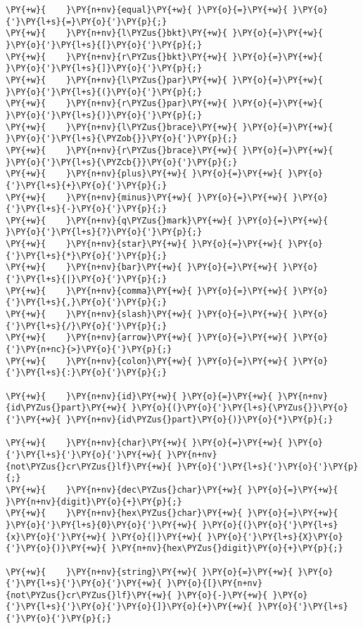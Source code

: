 \begin{Verbatim}[commandchars=\\\{\}]
\PY{+w}{    }\PY{n+nv}{equal}\PY{+w}{ }\PY{o}{=}\PY{+w}{ }\PY{o}{'}\PY{l+s}{=}\PY{o}{'}\PY{p}{;}
\PY{+w}{    }\PY{n+nv}{l\PYZus{}bkt}\PY{+w}{ }\PY{o}{=}\PY{+w}{ }\PY{o}{'}\PY{l+s}{[}\PY{o}{'}\PY{p}{;}
\PY{+w}{    }\PY{n+nv}{r\PYZus{}bkt}\PY{+w}{ }\PY{o}{=}\PY{+w}{ }\PY{o}{'}\PY{l+s}{]}\PY{o}{'}\PY{p}{;}
\PY{+w}{    }\PY{n+nv}{l\PYZus{}par}\PY{+w}{ }\PY{o}{=}\PY{+w}{ }\PY{o}{'}\PY{l+s}{(}\PY{o}{'}\PY{p}{;}
\PY{+w}{    }\PY{n+nv}{r\PYZus{}par}\PY{+w}{ }\PY{o}{=}\PY{+w}{ }\PY{o}{'}\PY{l+s}{)}\PY{o}{'}\PY{p}{;}
\PY{+w}{    }\PY{n+nv}{l\PYZus{}brace}\PY{+w}{ }\PY{o}{=}\PY{+w}{  }\PY{o}{'}\PY{l+s}{\PYZob{}}\PY{o}{'}\PY{p}{;}
\PY{+w}{    }\PY{n+nv}{r\PYZus{}brace}\PY{+w}{ }\PY{o}{=}\PY{+w}{  }\PY{o}{'}\PY{l+s}{\PYZcb{}}\PY{o}{'}\PY{p}{;}
\PY{+w}{    }\PY{n+nv}{plus}\PY{+w}{ }\PY{o}{=}\PY{+w}{ }\PY{o}{'}\PY{l+s}{+}\PY{o}{'}\PY{p}{;}
\PY{+w}{    }\PY{n+nv}{minus}\PY{+w}{ }\PY{o}{=}\PY{+w}{ }\PY{o}{'}\PY{l+s}{-}\PY{o}{'}\PY{p}{;}
\PY{+w}{    }\PY{n+nv}{q\PYZus{}mark}\PY{+w}{ }\PY{o}{=}\PY{+w}{ }\PY{o}{'}\PY{l+s}{?}\PY{o}{'}\PY{p}{;}
\PY{+w}{    }\PY{n+nv}{star}\PY{+w}{ }\PY{o}{=}\PY{+w}{ }\PY{o}{'}\PY{l+s}{*}\PY{o}{'}\PY{p}{;}
\PY{+w}{    }\PY{n+nv}{bar}\PY{+w}{ }\PY{o}{=}\PY{+w}{ }\PY{o}{'}\PY{l+s}{|}\PY{o}{'}\PY{p}{;}
\PY{+w}{    }\PY{n+nv}{comma}\PY{+w}{ }\PY{o}{=}\PY{+w}{ }\PY{o}{'}\PY{l+s}{,}\PY{o}{'}\PY{p}{;}
\PY{+w}{    }\PY{n+nv}{slash}\PY{+w}{ }\PY{o}{=}\PY{+w}{ }\PY{o}{'}\PY{l+s}{/}\PY{o}{'}\PY{p}{;}
\PY{+w}{    }\PY{n+nv}{arrow}\PY{+w}{ }\PY{o}{=}\PY{+w}{ }\PY{o}{'}\PY{n+nc}{>}\PY{o}{'}\PY{p}{;}
\PY{+w}{    }\PY{n+nv}{colon}\PY{+w}{ }\PY{o}{=}\PY{+w}{ }\PY{o}{'}\PY{l+s}{:}\PY{o}{'}\PY{p}{;}

\PY{+w}{    }\PY{n+nv}{id}\PY{+w}{ }\PY{o}{=}\PY{+w}{ }\PY{n+nv}{id\PYZus{}part}\PY{+w}{ }\PY{o}{(}\PY{o}{'}\PY{l+s}{\PYZus{}}\PY{o}{'}\PY{+w}{ }\PY{n+nv}{id\PYZus{}part}\PY{o}{)}\PY{o}{*}\PY{p}{;}

\PY{+w}{    }\PY{n+nv}{char}\PY{+w}{ }\PY{o}{=}\PY{+w}{ }\PY{o}{'}\PY{l+s}{'}\PY{o}{'}\PY{+w}{ }\PY{n+nv}{not\PYZus{}cr\PYZus{}lf}\PY{+w}{ }\PY{o}{'}\PY{l+s}{'}\PY{o}{'}\PY{p}{;}
\PY{+w}{    }\PY{n+nv}{dec\PYZus{}char}\PY{+w}{ }\PY{o}{=}\PY{+w}{ }\PY{n+nv}{digit}\PY{o}{+}\PY{p}{;}
\PY{+w}{    }\PY{n+nv}{hex\PYZus{}char}\PY{+w}{ }\PY{o}{=}\PY{+w}{ }\PY{o}{'}\PY{l+s}{0}\PY{o}{'}\PY{+w}{ }\PY{o}{(}\PY{o}{'}\PY{l+s}{x}\PY{o}{'}\PY{+w}{ }\PY{o}{|}\PY{+w}{ }\PY{o}{'}\PY{l+s}{X}\PY{o}{'}\PY{o}{)}\PY{+w}{ }\PY{n+nv}{hex\PYZus{}digit}\PY{o}{+}\PY{p}{;}

\PY{+w}{    }\PY{n+nv}{string}\PY{+w}{ }\PY{o}{=}\PY{+w}{ }\PY{o}{'}\PY{l+s}{'}\PY{o}{'}\PY{+w}{ }\PY{o}{[}\PY{n+nv}{not\PYZus{}cr\PYZus{}lf}\PY{+w}{ }\PY{o}{-}\PY{+w}{ }\PY{o}{'}\PY{l+s}{'}\PY{o}{'}\PY{o}{]}\PY{o}{+}\PY{+w}{ }\PY{o}{'}\PY{l+s}{'}\PY{o}{'}\PY{p}{;}


\end{Verbatim}
